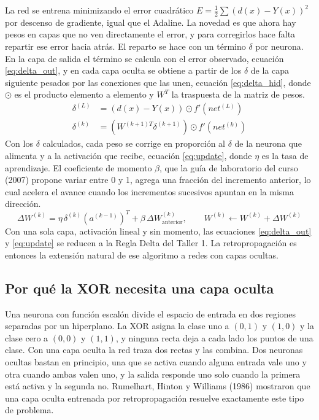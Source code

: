 \documentclass[11pt,letterpaper]{article}
\begin{document}
La red se entrena minimizando el error cuadrático $E = \tfrac{1}{2}\sum (d(x) - Y(x))^2$ por descenso de gradiente, igual que el Adaline. La novedad es que ahora hay pesos en capas que no ven directamente el error, y para corregirlos hace falta repartir ese error hacia atrás. El reparto se hace con un término $\delta$ por neurona. En la capa de salida el término se calcula con el error observado, ecuación \eqref{eq:delta_out}, y en cada capa oculta se obtiene a partir de los $\delta$ de la capa siguiente pesados por las conexiones que las unen, ecuación \eqref{eq:delta_hid}, donde $\odot$ es el producto elemento a elemento y $W^{T}$ la traspuesta de la matriz de pesos.
\begin{align}
    \delta^{(L)} &= \left(d(x) - Y(x)\right) \odot f'\left(net^{(L)}\right) \label{eq:delta_out} \\
    \delta^{(k)} &= \left(W^{(k+1)T}\delta^{(k+1)}\right) \odot f'\left(net^{(k)}\right) \label{eq:delta_hid}
\end{align}
Con los $\delta$ calculados, cada peso se corrige en proporción al $\delta$ de la neurona que alimenta y a la activación que recibe, ecuación \eqref{eq:update}, donde $\eta$ es la tasa de aprendizaje. El coeficiente de momento $\beta$, que la guía de laboratorio del curso (2007) propone variar entre 0 y 1, agrega una fracción del incremento anterior, lo cual acelera el avance cuando los incrementos sucesivos apuntan en la misma dirección.
\begin{equation}
    \Delta W^{(k)} = \eta\, \delta^{(k)} \left(a^{(k-1)}\right)^T + \beta\, \Delta W^{(k)}_{\text{anterior}}, \qquad W^{(k)} \leftarrow W^{(k)} + \Delta W^{(k)}
    \label{eq:update}
\end{equation}
Con una sola capa, activación lineal y sin momento, las ecuaciones \eqref{eq:delta_out} y \eqref{eq:update} se reducen a la Regla Delta del Taller 1. La retropropagación es entonces la extensión natural de ese algoritmo a redes con capas ocultas.

\subsection{Por qué la XOR necesita una capa oculta}

Una neurona con función escalón divide el espacio de entrada en dos regiones separadas por un hiperplano. La XOR asigna la clase uno a $(0,1)$ y $(1,0)$ y la clase cero a $(0,0)$ y $(1,1)$, y ninguna recta deja a cada lado los puntos de una clase. Con una capa oculta la red traza dos rectas y las combina. Dos neuronas ocultas bastan en principio, una que se activa cuando alguna entrada vale uno y otra cuando ambas valen uno, y la salida responde uno solo cuando la primera está activa y la segunda no. Rumelhart, Hinton y Williams (1986) mostraron que una capa oculta entrenada por retropropagación resuelve exactamente este tipo de problema.
\end{document}
